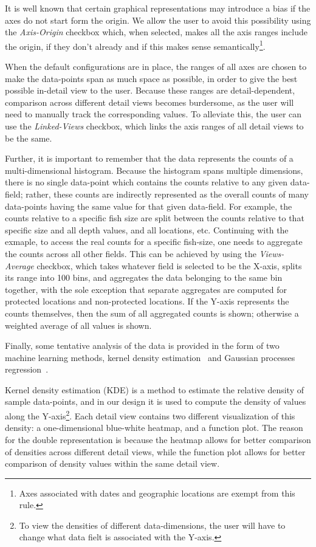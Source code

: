 \documentclass[letterpaper]{article} %
\begin{document}
It is well known that certain graphical representations may introduce a bias if
the axes do not start form the origin.  We allow the user to avoid this
possibility using the \emph{Axis-Origin} checkbox which, when selected, makes
all the axis ranges include the origin, if they don't already and if this makes
sense semantically\footnote{Axes associated with dates and geographic locations
are exempt from this rule.}.

When the default configurations are in place, the ranges of all axes are chosen
to make the data-points span as much space as possible, in order to give the
best possible in-detail view to the user.  Because these ranges are
detail-dependent, comparison across different detail views becomes burdersome,
as the user will need to manually track the corresponding values.  To alleviate
this, the user can use the \emph{Linked-Views} checkbox, which links the axis
ranges of all detail views to be the same.

Further, it is important to remember that the data represents the counts of
a multi-dimensional histogram.  Because the histogram spans multiple
dimensions, there is no single data-point which contains the counts relative to
any given data-field;  rather, these counts are indirectly represented as the
overall counts of many data-points having the same value for that given
data-field.  For example, the counts relative to a specific fish size are split
between the counts relative to that specific size and all depth values, and all
locations, etc.  Continuing with the exmaple, to access the real counts for
a specific fish-size, one needs to aggregate the counts across all other
fields.  This can be achieved by using the \emph{Views-Average} checkbox, which
takes whatever field is selected to be the X-axis, splits its range into
100 bins, and aggregates the data belonging to the same bin together, with the
    sole exception that separate aggregates are computed for protected
    locations and non-protected locations.  If the Y-axis represents the counts
    themselves, then the sum of all aggregated counts is shown;  otherwise
    a weighted average of all values is shown.

Finally, some tentative analysis of the data is provided in the form of two
machine learning methods, kernel density estimation~\cite{bishop2007pattern}
and Gaussian processes regression~\cite{rasmussen2006gaussian}.

Kernel density estimation (KDE) is a method to estimate the relative density of
sample data-points, and in our design it is used to compute the density of
values along the Y-axis\footnote{To view the densities of different
  data-dimensions, the user will have to change what data fielt is associated
with the Y-axis.}.  Each detail view contains two different visualization of
this density: a one-dimensional blue-white heatmap, and a function plot.  The
reason for the double representation is because the heatmap allows for better
comparison of densities across different detail views, while the function plot
allows for better comparison of density values within the same detail view.
\end{document}
